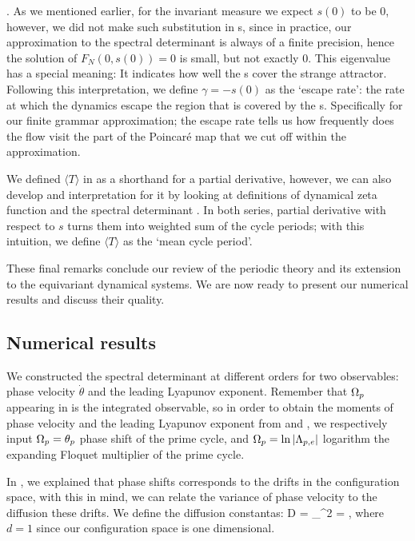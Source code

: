                         \label{e-Avgsigma} .
\eea
As we mentioned earlier, for the invariant measure we expect $s (0)$ to be $0$,
however, we did not make such substitution in \cycForm s, since in practice, 
our approximation to the spectral determinant is always of a finite precision, 
hence the solution of $F_N(0, s(0)) = 0$ is small, but not exactly $0$. This 
eigenvalue has a special meaning: It indicates how well the \po s cover the 
strange attractor. Following this interpretation, we define $\gamma = - s(0)$ 
as the `escape rate': the rate at which the dynamics escape the region that is
covered by the \po s. Specifically for our finite grammar approximation; the 
escape rate tells us how frequently does the flow visit the part of the 
Poincar\'e map that we cut off within the approximation.

We defined $\langle T \rangle$ in  as a shorthand for a partial
derivative, however, we can also develop and interpretation for it by looking 
at definitions of dynamical zeta function  and the 
spectral determinant . In both series, partial 
derivative with respect to $s$ turns them into weighted sum of the cycle 
periods; with this intuition, we define $\langle T \rangle$ as the `mean cycle 
period'.

These final remarks conclude our review of the periodic theory and its 
extension to the equivariant dynamical systems. We are now ready to present 
our numerical results and discuss their quality.

\subsection{Numerical results}
\label{s-NumResults}

We constructed the spectral determinant  at different
orders for two observables: phase velocity $\dot{\theta}$ and the leading 
Lyapunov exponent. Remember that $\Omega_p$ appearing in 
 is the integrated observable, so in order to 
obtain the moments of phase velocity and the leading Lyapunov exponent from 
 and , we respectively input 
$\Omega_p = \theta_p$ phase shift of the prime cycle, and 
$\Omega_p = \ln |\Lambda_{p,e}|$ logarithm the expanding Floquet multiplier of 
the prime cycle.

In , we explained that  phase shifts corresponds to
the drifts in the configuration space, with this in mind, we can relate the
variance of phase velocity to the diffusion these drifts. We define the 
diffusion constantas:
\beq
    D =  \sigma_{\dot{\theta}}^2
      =  ,
\eeq
where $d=1$ since our configuration space is one dimensional.

